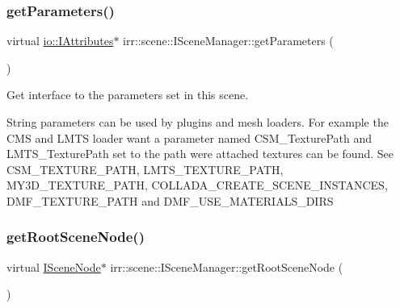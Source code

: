 \subsubsection{\texorpdfstring{get\+Parameters()}{getParameters()}\hspace{0.1cm}{\footnotesize\ttfamily [2/2]}}
{\footnotesize\ttfamily virtual \hyperlink{classirr_1_1io_1_1IAttributes}{io\+::\+I\+Attributes}$\ast$ irr\+::scene\+::\+I\+Scene\+Manager\+::get\+Parameters (\begin{DoxyParamCaption}{ }\end{DoxyParamCaption})\hspace{0.3cm}{\ttfamily [pure virtual]}}



Get interface to the parameters set in this scene. 

String parameters can be used by plugins and mesh loaders. For example the C\+MS and L\+M\+TS loader want a parameter named \textquotesingle{}C\+S\+M\+\_\+\+Texture\+Path\textquotesingle{} and \textquotesingle{}L\+M\+T\+S\+\_\+\+Texture\+Path\textquotesingle{} set to the path were attached textures can be found. See C\+S\+M\+\_\+\+T\+E\+X\+T\+U\+R\+E\+\_\+\+P\+A\+TH, L\+M\+T\+S\+\_\+\+T\+E\+X\+T\+U\+R\+E\+\_\+\+P\+A\+TH, M\+Y3\+D\+\_\+\+T\+E\+X\+T\+U\+R\+E\+\_\+\+P\+A\+TH, C\+O\+L\+L\+A\+D\+A\+\_\+\+C\+R\+E\+A\+T\+E\+\_\+\+S\+C\+E\+N\+E\+\_\+\+I\+N\+S\+T\+A\+N\+C\+ES, D\+M\+F\+\_\+\+T\+E\+X\+T\+U\+R\+E\+\_\+\+P\+A\+TH and D\+M\+F\+\_\+\+U\+S\+E\+\_\+\+M\+A\+T\+E\+R\+I\+A\+L\+S\+\_\+\+D\+I\+RS \mbox{\label{classirr_1_1scene_1_1ISceneManager_a4f7075320f1a3bf2838f29c23f78635f}} 
\subsubsection{\texorpdfstring{get\+Root\+Scene\+Node()}{getRootSceneNode()}\hspace{0.1cm}{\footnotesize\ttfamily [1/2]}}
{\footnotesize\ttfamily virtual \hyperlink{classirr_1_1scene_1_1ISceneNode}{I\+Scene\+Node}$\ast$ irr\+::scene\+::\+I\+Scene\+Manager\+::get\+Root\+Scene\+Node (\begin{DoxyParamCaption}{ }\end{DoxyParamCaption})\hspace{0.3cm}{\ttfamily [pure virtual]}}



